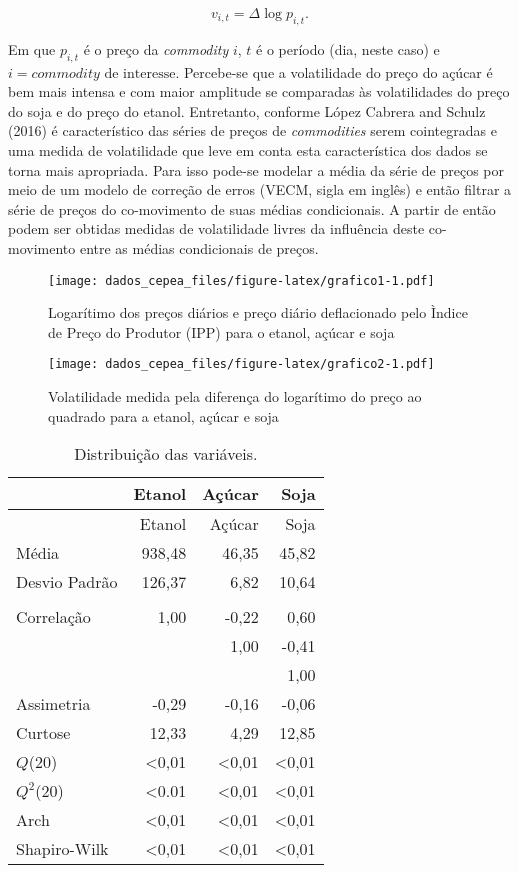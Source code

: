 \begin{equation}
v_{i,t} =\Delta \log p_{i,t}.
\end{equation}

Em que \(p_{i,t}\) é o preço da \emph{commodity} \(i\), \(t\) é o
período (dia, neste caso) e \(i = commodity \text{ de interesse}\).
Percebe-se que a volatilidade do preço do açúcar é bem mais intensa e
com maior amplitude se comparadas às volatilidades do preço do soja e do
preço do etanol. Entretanto, conforme López Cabrera and Schulz (2016) é
característico das séries de preços de \emph{commodities} serem
cointegradas e uma medida de volatilidade que leve em conta esta
característica dos dados se torna mais apropriada. Para isso pode-se
modelar a média da série de preços por meio de um modelo de correção de
erros (VECM, sigla em inglês) e então filtrar a série de preços do
co-movimento de suas médias condicionais. A partir de então podem ser
obtidas medidas de volatilidade livres da influência deste co-movimento
entre as médias condicionais de preços.

\begin{figure}[htbp]
\centering
\texttt{[image: dados\_cepea\_files/figure-latex/grafico1-1.pdf]}
\caption{Logarítimo dos preços diários e preço diário deflacionado pelo
Ìndice de Preço do Produtor (IPP) para o etanol, açúcar e soja}
\end{figure}

\begin{figure}[htbp]
\centering
\texttt{[image: dados\_cepea\_files/figure-latex/grafico2-1.pdf]}
\caption{Volatilidade medida pela diferença do logarítimo do preço ao
quadrado para a etanol, açúcar e soja}
\end{figure}

\pagebreak

\begin{longtable}[]{@{}lrrr@{}}
\caption{Distribuição das variáveis.}\tabularnewline
\toprule
& Etanol & Açúcar & Soja\tabularnewline
\midrule
\endfirsthead
\toprule
& Etanol & Açúcar & Soja\tabularnewline
\midrule
\endhead
Média & 938,48 & 46,35 & 45,82\tabularnewline
Desvio Padrão & 126,37 & 6,82 & 10,64\tabularnewline
& & &\tabularnewline
Correlação & 1,00 & -0,22 & 0,60\tabularnewline
& & 1,00 & -0,41\tabularnewline
& & & 1,00\tabularnewline
Assimetria & -0,29 & -0,16 & -0,06\tabularnewline
Curtose & 12,33 & 4,29 & 12,85\tabularnewline
\(Q\)(20) & \textless{}0,01 & \textless{}0,01 &
\textless{}0,01\tabularnewline
\(Q^2\)(20) & \textless{}0.01 & \textless{}0,01 &
\textless{}0,01\tabularnewline
Arch & \textless{}0,01 & \textless{}0,01 &
\textless{}0,01\tabularnewline
Shapiro-Wilk & \textless{}0,01 & \textless{}0,01 &
\textless{}0,01\tabularnewline
\bottomrule
\end{longtable}

